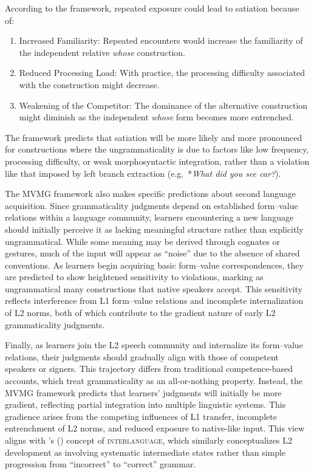 \documentclass[12pt,letterpaper]{article}
\newcommand{\term}[1]{\textsc{#1}}
\newcommand{\mention}[1]{\textit{#1}}
\newcommand{\posscite}[1]{\citeauthor{#1}'s (\citeyear{#1})}
\begin{document}
According to the framework, repeated exposure could lead to satiation because of:

\begin{enumerate}
    \item Increased Familiarity: Repeated encounters would increase the familiarity of the independent relative \mention{whose} construction.
    \item Reduced Processing Load: With practice, the processing difficulty associated with the construction might decrease.
    \item Weakening of the Competitor: The dominance of the alternative construction might diminish as the independent \mention{whose} form becomes more entrenched.
\end{enumerate}

The framework predicts that satiation will be more likely and more pronounced for constructions where the ungrammaticality is due to factors like low frequency, processing difficulty, or weak morphosyntactic integration, rather than a violation like that imposed by left branch extraction (e.g.\, *\mention{What did you see car?}).

\bigskip
The MVMG framework also makes specific predictions about second language acquisition. Since grammaticality judgments depend on established form--value relations within a language community, learners encountering a new language should initially perceive it as lacking meaningful structure rather than explicitly ungrammatical. While some meaning may be derived through cognates or gestures, much of the input will appear as \enquote{noise} due to the absence of shared conventions. As learners begin acquiring basic form--value correspondences, they are predicted to show heightened sensitivity to violations, marking as ungrammatical many constructions that native speakers accept. This sensitivity reflects interference from L1 form--value relations and incomplete internalization of L2 norms, both of which contribute to the gradient nature of early L2 grammaticality judgments.

Finally, as learners join the L2 speech community and internalize its form--value relations, their judgments should gradually align with those of competent speakers or signers. This trajectory differs from traditional competence-based accounts, which treat grammaticality as an all-or-nothing property. Instead, the MVMG framework predicts that learners' judgments will initially be more gradient, reflecting partial integration into multiple linguistic systems. This gradience arises from the competing influences of L1 transfer, incomplete entrenchment of L2 norms, and reduced exposure to native-like input. This view aligns with \posscite{selinker1972} concept of \term{interlanguage}, which similarly conceptualizes L2 development as involving systematic intermediate states rather than simple progression from \enquote{incorrect} to \enquote{correct} grammar.
\end{document}
